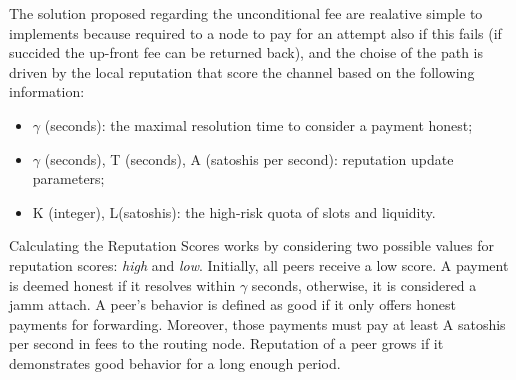 The solution proposed regarding the unconditional fee are realative simple to implements 
because required to a node to pay for an attempt also if this fails (if succided the up-front fee can 
be returned back), and the choise of the path is driven by the local reputation that 
score the channel based on the following information:

\begin{itemize}
    \item  $\gamma$ (seconds): the maximal resolution time to consider a payment honest;
    \item  $\gamma$  (seconds), T (seconds), A (satoshis per second): reputation update 
    parameters;
    \item  K (integer), L(satoshis): the high-risk quota of slots and liquidity.
\end{itemize}


Calculating the Reputation Scores works by considering two possible values
for reputation scores:  \emph{high}  and  \emph{low}. Initially, all peers 
receive a low score. A payment is deemed  honest  if it resolves within  
$\gamma$  seconds, otherwise, it is considered a jamm attach. 
A peer’s behavior is defined as  good  if it only offers honest payments 
for forwarding. Moreover, those payments must pay at least A satoshis 
per second in fees to the routing node. Reputation of a peer grows if it 
demonstrates good behavior for a long enough period.
